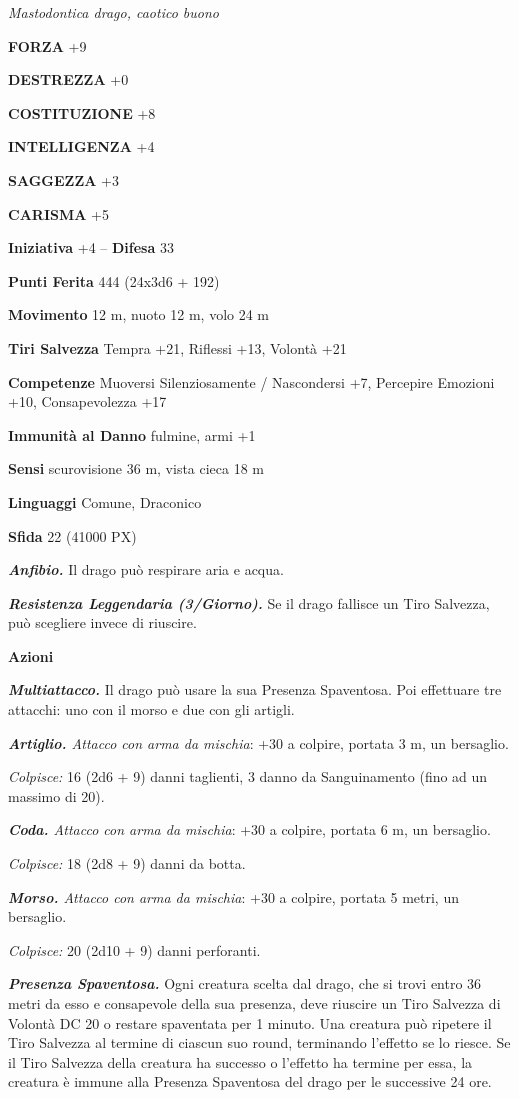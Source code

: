\begin{multicols}{2}
	\textit{Mastodontica drago, caotico buono}

	\textbf{FORZA} +9

	\textbf{DESTREZZA} +0

	\textbf{COSTITUZIONE} +8

	\textbf{INTELLIGENZA} +4

	\textbf{SAGGEZZA} +3

	\textbf{CARISMA} +5

	\textbf{Iniziativa} +4 -- \textbf{Difesa} 33

	\textbf{Punti Ferita} 444 (24x3d6 + 192)

	\textbf{Movimento} 12 m, nuoto 12 m, volo 24 m

	\textbf{Tiri Salvezza} Tempra +21, Riflessi +13, Volontà +21

	\textbf{Competenze} Muoversi Silenziosamente / Nascondersi +7, Percepire Emozioni +10, Consapevolezza +17

	\textbf{Immunità al Danno} fulmine, armi +1

	\textbf{Sensi} scurovisione 36 m, vista cieca 18 m

	\textbf{Linguaggi} Comune, Draconico

	\textbf{Sfida} 22 (41000 PX)

	\textit{\textbf{Anfibio.}} Il drago può respirare aria e acqua.

	\textit{\textbf{Resistenza Leggendaria (3/Giorno).}} Se il drago fallisce un Tiro Salvezza, può scegliere invece di riuscire.

	\textbf{Azioni}

	\textit{\textbf{Multiattacco.}} Il drago può usare la sua Presenza Spaventosa. Poi effettuare tre attacchi: uno con il morso e due con gli artigli.

	\textit{\textbf{Artiglio.} Attacco con arma da mischia}: +30 a colpire, portata 3 m, un bersaglio.

	\textit{Colpisce:} 16 (2d6 + 9) danni taglienti, 3 danno da Sanguinamento (fino ad un massimo di 20).

	\textit{\textbf{Coda.} Attacco con arma da mischia}: +30 a colpire, portata 6 m, un bersaglio.

	\textit{Colpisce:} 18 (2d8 + 9) danni da botta.

	\textit{\textbf{Morso.} Attacco con arma da mischia}: +30 a colpire, portata 5 metri, un bersaglio.

	\textit{Colpisce:} 20 (2d10 + 9) danni perforanti.

	\textit{\textbf{Presenza Spaventosa.}} Ogni creatura scelta dal drago, che si trovi entro 36 metri da esso e consapevole della sua presenza, deve riuscire un Tiro Salvezza di Volontà DC 20 o restare spaventata per 1 minuto. Una creatura può ripetere il Tiro Salvezza al termine di ciascun suo round, terminando l'effetto se lo riesce. Se il Tiro Salvezza della creatura ha successo o l'effetto ha termine per essa, la creatura è immune alla Presenza Spaventosa del drago per le successive 24 ore.


\end{multicols}
